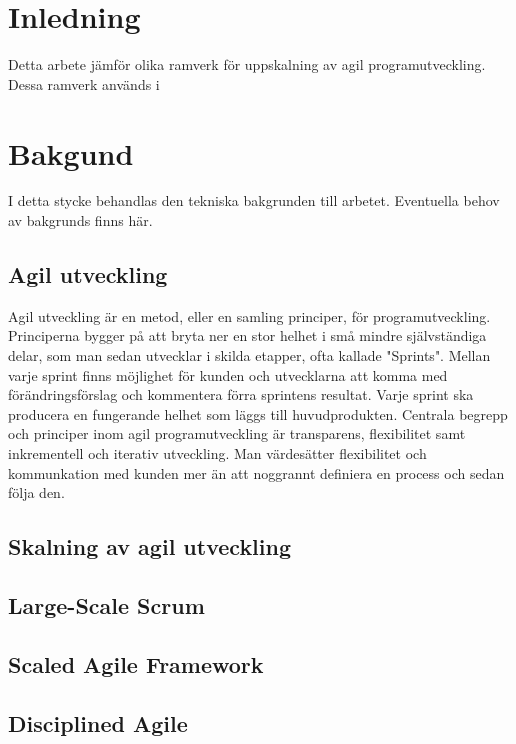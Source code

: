\section{Inledning}

Detta arbete jämför olika ramverk för uppskalning av agil programutveckling. Dessa ramverk används i	

\newpage

\section{Bakgund} 	


I detta stycke behandlas den tekniska bakgrunden till arbetet. Eventuella behov av bakgrunds finns här.

\subsection{Agil utveckling}

Agil utveckling är en metod, eller en samling principer, för programutveckling. Principerna bygger på att bryta ner en stor helhet i små mindre självständiga delar, som man sedan utvecklar i skilda etapper, ofta kallade "Sprints".
Mellan varje sprint finns möjlighet för kunden och utvecklarna att komma med förändringsförslag och kommentera förra sprintens resultat. Varje sprint ska producera en fungerande helhet som läggs till huvudprodukten. Centrala begrepp och principer inom agil programutveckling är transparens, flexibilitet samt inkrementell och iterativ utveckling. Man värdesätter flexibilitet och kommunkation med kunden mer än att noggrannt definiera en process och sedan följa den. \cite{agile_manifesto}

\subsection{Skalning av agil utveckling}


\subsection{Large-Scale Scrum}


\subsection{Scaled Agile Framework}


\subsection{Disciplined Agile}


